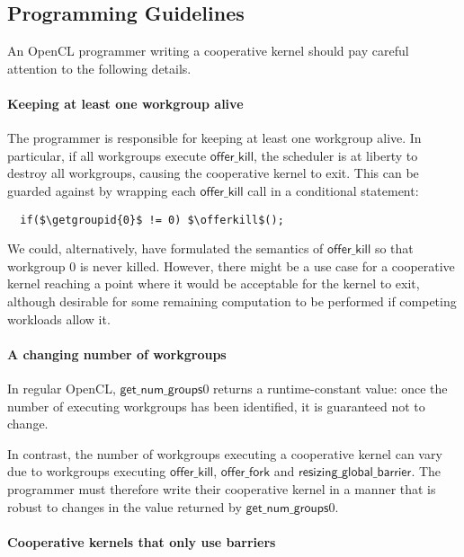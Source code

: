 \documentclass[nocopyrightspace]{sigplanconf-pldi16}
\newcommand{\offerfork}{\mathsf{offer\_fork}}
\newcommand{\offerkill}{\mathsf{offer\_kill}}
\newcommand{\resizingglobalbarrier}{\mathsf{resizing\_global\_barrier}}
\newcommand{\getgroupid}{\mathsf{get\_group\_id}}
\newcommand{\getnumgroups}{\mathsf{get\_num\_groups}}
\begin{document}
\subsection{Programming Guidelines}\label{sec:programmingguidelines}

An OpenCL programmer writing a cooperative kernel should pay careful
attention to the following details.

\paragraph{Keeping at least one workgroup alive}

The programmer is responsible for keeping at least one workgroup alive.  In particular, if all workgroups execute $\offerkill$, the scheduler is at liberty to destroy all workgroups, causing the cooperative kernel to exit.  This can be guarded against by wrapping each $\offerkill$ call in a conditional statement:

\lstset{basicstyle=\tt}
\begin{lstlisting}
  if($\getgroupid{0}$ != 0) $\offerkill$();
\end{lstlisting}
\lstset{basicstyle=\scriptsize\tt}

We could, alternatively, have formulated the semantics of $\offerkill$
so that workgroup 0 is never killed.  However, there might be a use
case for a cooperative kernel reaching a point where it would be
acceptable for the kernel to exit, although desirable for some
remaining computation to be performed if competing workloads allow it.

\paragraph{A changing number of workgroups}

In regular OpenCL, $\getnumgroups{0}$ returns a runtime-constant
value: once the number of executing workgroups has been identified, it
is guaranteed not to change.

In contrast, the number of workgroups executing a cooperative kernel
can vary due to workgroups executing $\offerkill$, $\offerfork$ and
$\resizingglobalbarrier$.  The programmer must therefore write their
cooperative kernel in a manner that is robust to changes in the value
returned by $\getnumgroups{0}$.

\paragraph{Cooperative kernels that only use barriers}
\end{document}
